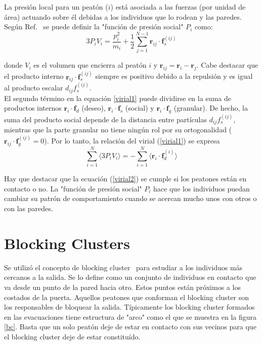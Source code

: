 La presión local para un peatón ($i$) está asociada a las fuerzas (por unidad de área) actuando sobre él debidas a los individuos que lo rodean y las paredes. Según Ref.~\cite{lion} se puede definir la "función de presión social" $P_i$ como:\\

\begin{equation}
3P_iV_i=\displaystyle\frac{p_i^2}{m_i} + \frac{1}{2}
\displaystyle\sum_{j=1}^{N-1}
\mathbf{r}_{ij}\cdot\mathbf{f}_s^{(ij)}\label{pv}
\end{equation}

\noindent donde $V_i$ es el volumen que encierra al peatón $i$ y 
$\mathbf{r}_{ij}=\mathbf{r}_{i}-\mathbf{r}_j$. Cabe destacar que el producto interno $\mathbf{r}_{ij}\cdot\mathbf{f}_s^{(ij)}$ siempre es positivo debido a la repulsión y es igual al producto escalar $d_{ij}f_s^{(ij)}$.  \\ 

El segundo término en la equación \ref{virial1} puede dividirse en la suma de productos internos $\mathbf{r}_i\cdot\mathbf{f}_d$ (deseo), 
$\mathbf{r}_i\cdot\mathbf{f}_s$ (social) y $\mathbf{r}_i\cdot\mathbf{f}_g$ (granular). De hecho, la suma del producto social depende de la distancia entre partículas $d_{ij}f_s^{(ij)}$, mientras que la parte granular no tiene ningún rol por su ortogonalidad ($\mathbf{r}_{ij}\cdot\mathbf{f}_g^{(ij)}=0$). Por lo tanto, la relación del virial (\ref{virial1}) se expresa \\  


\begin{equation}
 \displaystyle\sum_{i=1}^N\langle3P_iV_i 
\rangle=-\displaystyle\sum_{i=1}^N \langle
\mathbf{r}_i\cdot\mathbf{f}_d^{(i)}\rangle\label{virial2}
\end{equation}

Hay que destacar que la ecuación (\ref{virial2}) se cumple si los peatones están en contacto o no. La "función de presión social" $P_i$ hace que los individuos puedan cambiar su patrón de comportamiento cuando se acercan mucho unos con otros o con las paredes. \\ 


\section{Blocking Clusters}

Se utilizó el concepto de blocking cluster~\cite{Dorso1} para estudiar a los individuos más cercanos a la salida. Se lo define como un conjunto de individuos en contacto que va desde un punto de la pared hacia otro. Estos puntos están próximos a los costados de la puerta. Aquellos peatones que conforman el blocking cluster son los responsables de bloquear la salida. Típicamente los blocking cluster formados en las evacuaciones tiene estructura de "arco" como el que se muestra en la figura \ref{bc}. Basta que un solo peatón deje de estar en contacto con sus vecinos para que el blocking cluster deje de estar constituído. \\

